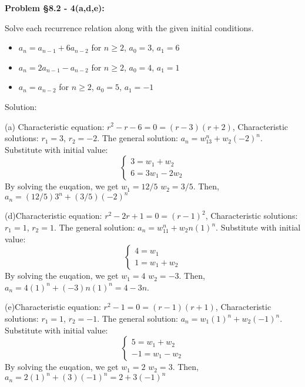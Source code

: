 \documentclass{article}
\newenvironment{problem}[1]
    {\begin{mdframed}[default]
    \textbf{Problem #1:}
    }
    {\end{mdframed}
    }
\begin{document}
\begin{problem}{\S 8.2 - 4(a,d,e)}
Solve each recurrence relation along with the given initial conditions.
\begin{itemize}
    \item[(a)] $a_n = a_{n-1} + 6a_{n-2}$ for $n \geq 2$, $a_0 = 3$, $a_1 = 6$
    \item[(d)] $a_n = 2a_{n-1} - a_{n-2}$ for $n \geq 2$, $a_0 = 4$, $a_1 = 1$
    \item[(e)] $a_n = a_{n-2}$ for $n \geq 2$, $a_0 = 5$, $a_1 = -1$
\end{itemize}

Solution:

(a) Characteristic equation: $r^2-r-6=0=(r-3)(r+2)$, Characteristic solutions: $r_1=3$, $r_2=-2$. The general solution: $a_n=w_13^n+w_2(-2)^n$. Substitute with initial value: \[\begin{cases}3=w_1+w_2\\6=3w_1-2w_2\end{cases}\]
By solving the euqation, we get $w_1=12/5$ $w_2=3/5$. Then, $a_n=(12/5)3^n+(3/5)(-2)^n$

(d)Characteristic equation: $r^2-2r+1=0=(r-1)^2$, Characteristic solutions: $r_1=1$, $r_2=1$. The general solution: $a_n=w_11^n+w_2n(1)^n$. Substitute with initial value: \[\begin{cases}4=w_1\\1=w_1+w_2\end{cases}\]
By solving the euqation, we get $w_1=4$ $w_2=-3$. Then, $a_n=4(1)^n+(-3)n(1)^n=4-3n$.

(e)Characteristic equation: $r^2-1=0=(r-1)(r+1)$, Characteristic solutions: $r_1=1$, $r_2=-1$. The general solution: $a_n=w_1(1)^n+w_2(-1)^n$. Substitute with initial value: \[\begin{cases}5=w_1+w_2\\-1=w_1-w_2\end{cases}\]
By solving the euqation, we get $w_1=2$ $w_2=3$. Then, $a_n=2(1)^n+(3)(-1)^n=2+3(-1)^n$

\end{problem}
\end{document}
